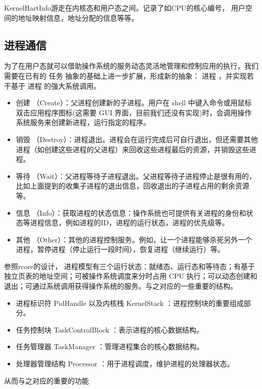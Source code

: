 KernelHartInfo游走在内核态和用户态之间。记录了如CPU的核心编号， 用户空间的地址映射信息，地址分配的信息等等。

\subsection{进程通信}

为了在用户态就可以借助操作系统的服务动态灵活地管理和控制应用的执行，我们需要在已有的 任务 抽象的基础上进一步扩展，形成新的抽象： 进程 ，并实现若干基于 进程 的强大系统调用。

\begin{itemize}
\item 创建 （Create）：父进程创建新的子进程。用户在 shell 中键入命令或用鼠标双击应用程序图标(这需要 GUI 界面，目前我们还没有实现)时，会调用操作系统服务来创建新进程，运行指定的程序。
\item 销毁 （Destroy）：进程退出。进程会在运行完成后可自行退出，但还需要其他进程（如创建这些进程的父进程）来回收这些进程最后的资源，并销毁这些进程。
\item 等待 （Wait）：父进程等待子进程退出。父进程等待子进程停止是很有用的，比如上面提到的收集子进程的退出信息，回收退出的子进程占用的剩余资源等。
\item 信息 （Info）：获取进程的状态信息：操作系统也可提供有关进程的身份和状态等进程信息，例如进程的ID，进程的运行状态，进程的优先级等。
\item 其他 （Other）：其他的进程控制服务。例如，让一个进程能够杀死另外一个进程，暂停进程（停止运行一段时间），恢复进程（继续运行）等。
\end{itemize}

参照rcore的设计， 进程模型有三个运行状态：就绪态、运行态和等待态；有基于独立页表的地址空间；可被操作系统调度来分时占用 CPU 执行；可以动态创建和退出；可通过系统调用获得操作系统的服务。与之对应的一些重要的结构。

\begin{itemize}
\item 进程标识符 PidHandle 以及内核栈 KernelStack ：进程控制块的重要组成部分。
\item 任务控制块 TaskControlBlock ：表示进程的核心数据结构。
\item 任务管理器 TaskManager ：管理进程集合的核心数据结构。
\item 处理器管理结构 Processor ：用于进程调度，维护进程的处理器状态。
\end{itemize}

从而与之对应的重要的功能

